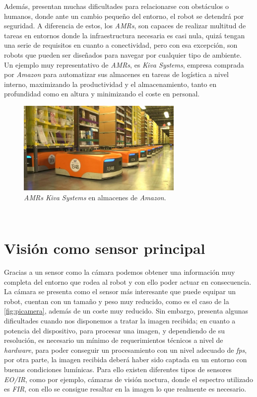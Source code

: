 Además, presentan muchas dificultades para relacionarse con obstáculos o humanos, donde ante un cambio pequeño del entorno, el robot se detendrá por seguridad. A diferencia de estos, los  \textit{AMRs}, son capaces de realizar multitud de tareas en entornos donde la infraestructura necesaria es casi nula, quizá tengan una serie de requisitos en cuanto a conectividad, pero con esa excepción, son robots que pueden ser diseñados para navegar por cualquier tipo de ambiente.\\

Un ejemplo muy representativo de  \textit{AMRs}, es \textit{Kiva Systems}, empresa comprada por \textit{Amazon} para automatizar sus almacenes en tareas de logística a nivel interno, maximizando la productividad y el almacenamiento, tanto en profundidad como en altura y minimizando el coste en personal.\\

\begin{figure} [h!]
	\begin{center}
		\includegraphics[width=8cm]{figs/kivasystems}
	\end{center}
	\caption{\textit{AMRs Kiva Systems} en almacenes de \textit{Amazon}.}
	\label{fig:kivasystems}
\end{figure}\

\section{Visión como sensor principal}
\label{sec:vision}
Gracias a un sensor como la cámara podemos obtener una información muy completa del entorno que rodea al robot y con ello poder actuar en consecuencia. La cámara se presenta como el sensor más interesante que puede equipar un robot, cuentan con un tamaño y peso muy reducido, como es el caso de la \ref{fig:picamera}, además de un coste muy reducido. Sin embargo, presenta algunas dificultades cuando nos disponemos a tratar la imagen recibida; en cuanto a potencia del dispositivo, para procesar una imagen, y dependiendo de su resolución, es necesario un mínimo de requerimientos técnicos a nivel de \textit{hardware}, para poder conseguir un procesamiento con un nivel adecuado de \textit{fps}, por otra parte, la imagen recibida deberá haber sido captada en un entorno con buenas condiciones lumínicas. Para ello existen diferentes tipos de sensores \textit{EO/IR}, como por ejemplo, cámaras de visión noctura, donde el espectro utilizado es \textit{FIR}, con ello se consigue resaltar en la imagen lo que realmente es necesario.\\


